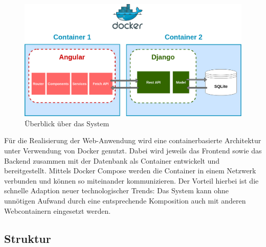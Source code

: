 \documentclass[conference]{IEEEtran}
\begin{document}
\begin{figure}[!h]
	\centering
	\includegraphics[width=0.9\columnwidth]{./figures/architecture_with_docker}
	\caption{Überblick über das System}
\end{figure}
Für die Realisierung der Web-Anwendung wird eine containerbasierte Architektur unter Verwendung von Docker genutzt. Dabei wird jeweils das Frontend sowie das Backend zusammen mit der Datenbank als Container entwickelt und bereitgestellt. Mittels Docker Compose werden die Container in einem Netzwerk verbunden und können so miteinander kommunizieren. Der Vorteil hierbei ist die schnelle Adaption neuer technologischer Trends: Das System kann ohne unnötigen Aufwand durch eine entsprechende Komposition auch mit anderen Webcontainern eingesetzt werden.
\pagebreak

\subsection{Struktur}\label{structure}
\end{document}
